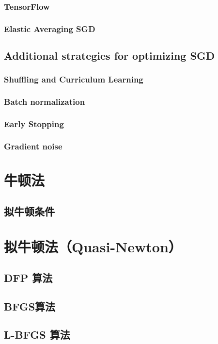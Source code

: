 \documentclass[10pt,a4paper]{ctexbook}
\begin{document}
\subsubsection{TensorFlow}
\subsubsection{Elastic Averaging SGD}

\subsection{Additional strategies for optimizing SGD}
\subsubsection{Shuffling and Curriculum Learning}
\subsubsection{Batch normalization}
\subsubsection{Early Stopping}
\subsubsection{Gradient noise}


\section{牛顿法}
\subsection{拟牛顿条件}

\section{拟牛顿法（Quasi-Newton）}
\subsection{DFP 算法}
\subsection{BFGS算法}
\subsection{L-BFGS 算法}
\end{document}
